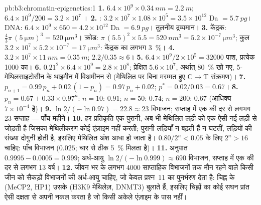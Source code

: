 \begin{solution}{pb:b3:chromatin-epigenetics:1}
\textbf{1.} $6.4\times 10^{9}\times \qty{0.34}{nm} = \qty{2.2}{m}$;
$6.4\times 10^{9}/200 = 3.2\times 10^{7}$ ।
\textbf{2.} : $3.2\times 10^{7}\times 1.08\times 10^{5} =
3.5\times 10^{12}$ Da $= \qty{5.7}{pg}$। DNA: $6.4\times 10^{9}\times
650 = 4.2\times 10^{12}$ Da $= \qty{6.9}{pg}$। तुलनीय द्रव्यमान।
\textbf{3.} केंद्रक: $\tfrac{4}{3}\pi\,(\qty{5}{\micro m})^{3} =
\qty{520}{\micro m^3}$। क्रोड: $\pi\,(5.5)^{2}\times 5.5 =
\qty{520}{nm^3} = 5.2\times 10^{-7}\,\unit{\micro m^3}$; कुल
$3.2\times 10^{7}\times 5.2\times 10^{-7} = \qty{17}{\micro m^3}$:
केंद्रक का लगभग \qty{3}{\%}।
\textbf{4.} $3.2\times 10^{7}\times \qty{11}{nm} = \qty{0.35}{m}$;
 $2.2/0.35 \approx 6$।
\textbf{5.} $6.4\times 10^{9}/2\times 10^{5} = \num{32000}$ पाश,
प्रत्येक \num{1000}  का।
\textbf{6.} $0.21^{2}\times 6.4\times 10^{9} = 2.8\times 10^{8}$;
प्रेक्षित $5.6\times 10^{7}$, अर्थात् \qty{80}{\%} खो गए,
5-मेथिलसाइटोसीन के थाइमीन में विअमीनन से (मेथिलित  पर बिना मरम्मत
हुए C$\to$T संक्रमण)।
\textbf{7.} $p_{n+1} = 0.99\,p_{n} + 0.02\,(1 - p_{n}) = 0.97\,p_{n} +
0.02$; $p^{*} = 0.02/0.03 = 0.67$।
\textbf{8.} $p_{n} = 0.67 + 0.33\times 0.97^{n}$: $n = 10$: $0.91$;
$n = 50$: $0.74$; $n = 200$: $0.67$ (आधिक्य $7\times 10^{-4}$ है)।
\textbf{9.} $\ln 2/(-\ln 0.97) = 22.8 \approx 23$ विभाजन; सप्ताह में
एक की दर से लगभग \num{23} सप्ताह --- पाँच महीने।
\textbf{10.} हर प्रतिकृति एक पुरानी, अब भी मेथिलित लड़ी को एक ऐसी नई
लड़ी से जोड़ती है जिसका मेथिलीकरण कोई एंज़ाइम नहीं करती; पुरानी लड़ियाँ
न बढ़ती हैं न घटतीं, लड़ियों की संख्या दोगुनी होती है, इसलिए मेथिलित
अंश आधा हो जाता है। $0.80/2^{n} < 0.05$ के लिए $2^{n} > 16$ चाहिए:
पाँच विभाजन ($0.025$; चार से ठीक \qty{5}{\%} मिलता है)।
\textbf{11.} अनुपात $0.9995 - 0.0005 = 0.999$; अर्ध-आयु $\ln
2/(-\ln 0.999) \approx 690$ विभाजन, सप्ताह में एक की दर से लगभग
\num{13} वर्ष।
\textbf{12.} जीवन भर के लगभग \num{4000} साप्ताहिक विभाजनों तक मौन
रहने वाले किसी जीन को सैकड़ों विभाजनों की अर्ध-आयु चाहिए, जो केवल
प्रश्न~11 का पुनर्भरण देता है: चिह्न के  (MeCP2, HP1) उसके 
(H3K9 मेथिलेज़, DNMT3) बुलाते हैं, इसलिए चिह्नों का कोई सघन प्रांत ऐसी
दक्षता से अपनी नकल करता है जो किसी अकेले एंज़ाइम के पास नहीं।

\end{solution}
